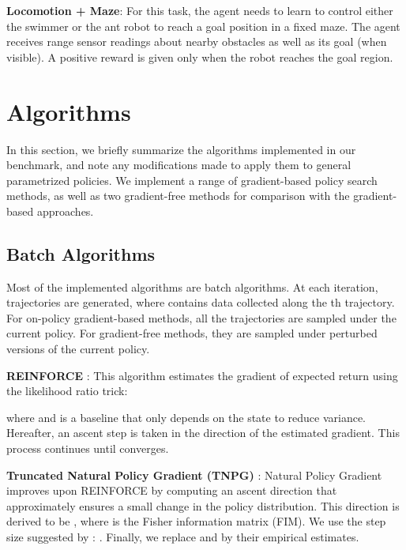 \documentclass{article}
\begin{document}
{\bf Locomotion + Maze}: For this task, the agent needs to learn to control either the swimmer or the ant robot  to reach a goal position in a fixed maze. The agent receives range sensor readings about nearby obstacles as well as its goal (when visible). A positive reward is given only when the robot reaches the goal region.







\section{Algorithms}

In this section, we briefly summarize the algorithms implemented in our benchmark, and note any modifications made to apply them to general parametrized policies. We implement a range of gradient-based policy search methods, as well as two gradient-free methods for comparison with the gradient-based approaches.




\subsection{Batch Algorithms}
Most of the implemented algorithms are batch algorithms. At each iteration,  trajectories  are generated, where
 contains data collected along the th trajectory. For on-policy gradient-based methods, all the trajectories are sampled under the current policy. For gradient-free methods, they are sampled under perturbed versions of the current policy.
    




{\bf REINFORCE} \cite{Williams92VPG}: This algorithm estimates the gradient of expected return  using the likelihood ratio trick:

where  and  is a baseline that only depends on the state  to reduce variance. Hereafter, an ascent step is taken in the direction of the estimated gradient. This process continues until  converges.

{\bf Truncated Natural Policy Gradient (TNPG)} \cite{Kakade02NPG, Peters03PG, Bagnell03Cov, Schulman15TRPO}: Natural Policy Gradient improves upon REINFORCE by computing an ascent direction that approximately ensures a small change in the policy distribution. This direction is derived to be , where  is the Fisher information matrix (FIM). We use the step size suggested by \citet{peters2008reinforcement}: . Finally, we replace  and  by their empirical estimates.
\end{document}
